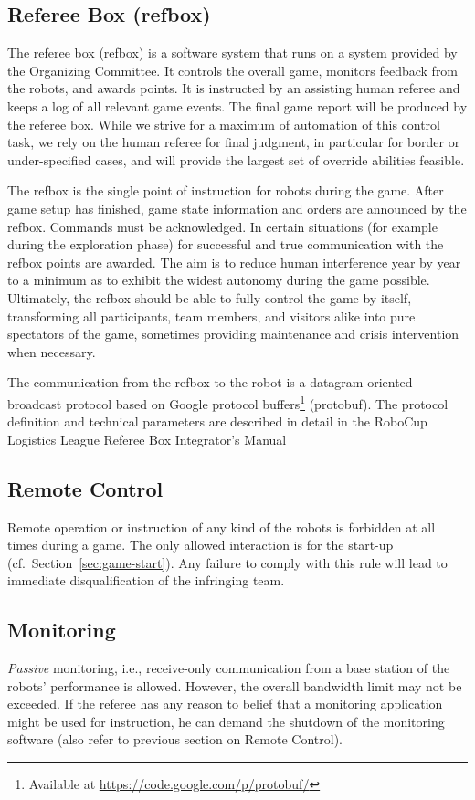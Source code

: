 \documentclass[12pt,twoside]{article}
\newcommand{\refsec}[1]{Section~\ref{#1}}
\begin{document}
\subsection{Referee Box (refbox)}
\label{sec:referee-box}
The referee box (refbox) is a software system that runs on a system
provided by the Organizing Committee. It controls the overall game,
monitors feedback from the robots, and awards points. It is instructed
by an assisting human referee and keeps a log of all relevant game
events. The final game report will be produced by the referee
box. While we strive for a maximum of automation of this control task,
we rely on the human referee for final judgment, in particular for
border or under-specified cases, and will provide the largest set of
override abilities feasible.

The refbox is the single point of instruction for robots during the
game. After game setup has finished, game state information and orders
are announced by the refbox. Commands must be acknowledged. In certain
situations (for example during the exploration phase) for successful
and true communication with the refbox points are awarded. The aim is
to reduce human interference year by year to a minimum as to exhibit
the widest autonomy during the game possible. Ultimately, the refbox
should be able to fully control the game by itself, transforming all
participants, team members, and visitors alike into pure spectators of
the game, sometimes providing maintenance and crisis intervention when
necessary.

The communication from the refbox to the robot is a datagram-oriented
broadcast protocol based on Google protocol buffers\footnote{Available
  at \url{https://code.google.com/p/protobuf/}} (protobuf). The
protocol definition and technical parameters are described in detail
in the RoboCup Logistics League Referee Box Integrator's
Manual~\cite{RefBoxIntManual}

\subsection{Remote Control}
\label{sec:remote-control}
Remote operation or instruction of any kind of the robots is forbidden
at all times during a game. The only allowed interaction is for the
start-up (cf.~\refsec{sec:game-start}). Any failure to comply with
this rule will lead to immediate disqualification of the infringing
team.

\subsection{Monitoring}
\label{sec:monitoring}
\emph{Passive} monitoring, i.e., receive-only communication from a base
station of the robots' performance is allowed. However, the overall
bandwidth limit may not be exceeded.
If the referee has any reason to belief that a monitoring application
might be used for instruction, he can demand the shutdown of the
monitoring software (also refer to previous section on Remote
Control).
\end{document}
